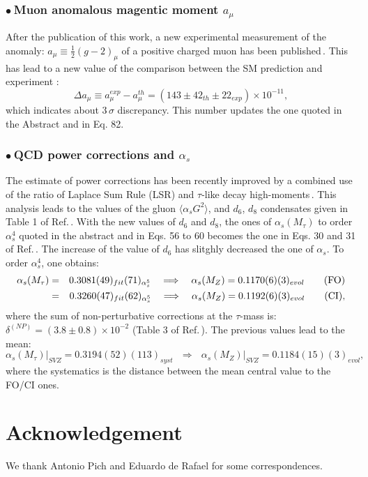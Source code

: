\documentclass[review]{elsarticle}
\def\beq{\begin{equation}}
\def\eeq{\end{equation}}
\def\bea{\begin{eqnarray}}
\def\eea{\end{eqnarray}}
\def\nnb{\nonumber}
\def\lrar{\Longrightarrow}
\def\nnb{\nonumber}
\def\la{\langle}
\def\ra{\rangle}
\def\b{$\bullet~$}
\begin{document}
\subsubsection*{\b Muon anomalous magentic moment $a_\mu$}
After the publication of this work, a new experimental measurement of the  anomaly: $a_\mu\equiv \frac{1}{2}(g-2)_\mu$ of a positive charged muon has  been published\,\cite{MG2}. This has lead to a new value of the comparison between the SM prediction and experiment\,\cite{SN23}\,:
\beq
\Delta a_\mu\equiv a_\mu^{exp}-a_\mu^{th} = (143\pm 42_{th}\pm 22_{exp})\times 10^{-11}, 
\eeq
which indicates about 3\,$\sigma$ discrepancy. This number updates the one quoted in the Abstract and in Eq. 82. 

\subsubsection*{\b QCD power corrections and $\alpha_s$}
The estimate of power corrections has been recently improved by a combined use of the ratio of Laplace Sum Rule (LSR) and $\tau$-like decay high-moments\,\cite{SN24}. This analysis leads to the values of the gluon $\la\alpha_s G^2\ra$,  and $d_6$, $d_8$ condensates given in Table 1 of Ref.\,\cite{SN24}.  With the new values of $d_6$ and $d_8$,  the ones of  $\alpha_s(M_\tau)$ to order $\alpha_s^4$ quoted in the abstract and in Eqs. 56 to 60 becomes the one in Eqs. 30 and 31 of Ref.\,\cite{SN24}. The increase of the value of $d_6$ has slitghly decreased the one of $\alpha_s$. To order $\alpha_s^4$, one obtains:
\bea
\alpha_s(M_\tau) &=& 0.3081(49)_{fit}(71)_{\alpha_s^5} ~~~\lrar~~~\alpha_s(M_Z) = 0.1170(6)(3)_{evol} ~~~~~~   {\rm (FO)}\nnb\\
&=& 0. 3260(47)_{fit}(62)_{\alpha_s^5} ~~~\lrar~~~\alpha_s(M_Z) = 0.1192(6)(3)_{evol} ~~~~~~{\rm (CI)},
\label{eq:as-foci}
\eea
where the sum of non-perturbative corrections at the $\tau$-mass  is: $\delta^{(NP)}=(3.8\pm 0.8)\times 10^{-2} $ (Table 3 of Ref.\,\cite{SN24}). The previous values lead to the mean:
\beq
\alpha_s(M_\tau)\vert_{SVZ} = 0.3194(52)(113)_{syst} ~~~\lrar~~~\alpha_s(M_Z)\vert_{SVZ} = 0.1184(15)(3)_{evol},
\label{eq:as-final}
\eeq
where the systematics is the distance between the mean central value to the FO/CI ones. 
\section*{Acknowledgement}
We thank %
Antonio Pich and  Eduardo de Rafael for some correspondences.
\newpage

\end{document}
